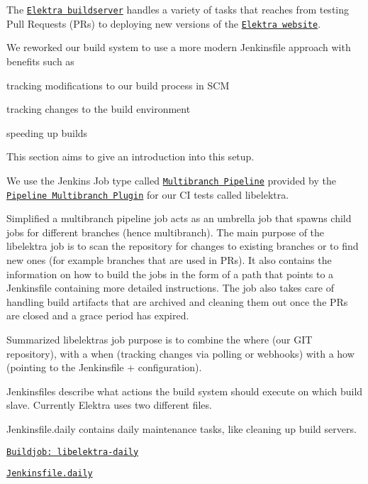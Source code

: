 The \href{https://build.libelektra.org/}{\tt Elektra buildserver} handles a variety of tasks that reaches from testing Pull Requests (P\+Rs) to deploying new versions of the \href{https://www.libelektra.org}{\tt Elektra website}.

We reworked our build system to use a more modern Jenkinsfile approach with benefits such as


\begin{DoxyItemize}
\item tracking modifications to our build process in S\+CM
\item tracking changes to the build environment
\item speeding up builds
\end{DoxyItemize}

This section aims to give an introduction into this setup.

We use the Jenkins Job type called \href{https://jenkins.io/doc/book/pipeline/multibranch/#creating-a-multibranch-pipeline}{\tt Multibranch Pipeline} provided by the \href{https://wiki.jenkins.io/display/JENKINS/Pipeline+Multibranch+Plugin}{\tt Pipeline Multibranch Plugin} for our CI tests called {\ttfamily libelektra}.

Simplified a multibranch pipeline job acts as an umbrella job that spawns child jobs for different branches (hence multibranch). The main purpose of the libelektra job is to scan the repository for changes to existing branches or to find new ones (for example branches that are used in PR\textquotesingle{}s). It also contains the information on how to build the jobs in the form of a path that points to a Jenkinsfile containing more detailed instructions. The job also takes care of handling build artifacts that are archived and cleaning them out once the PR\textquotesingle{}s are closed and a grace period has expired.

Summarized libelektra\textquotesingle{}s job purpose is to combine the where (our G\+IT repository), with a when (tracking changes via polling or webhooks) with a how (pointing to the Jenkinsfile + configuration).

Jenkinsfiles describe what actions the build system should execute on which build slave. Currently Elektra uses two different files.


\begin{DoxyItemize}
\item Jenkinsfile.daily contains daily maintenance tasks, like cleaning up build servers.
\item \href{https://build.libelektra.org/job/libelektra-daily/}{\tt Buildjob\+: libelektra-\/daily}
\item \href{https://master.libelektra.org/scripts/jenkins/Jenkinsfile.daily}{\tt Jenkinsfile.\+daily}
\end{DoxyItemize}


